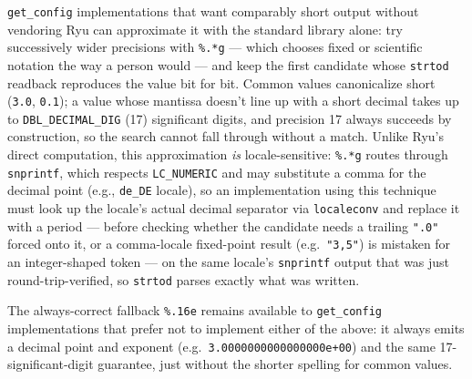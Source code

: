 \documentclass[../RFC-HDFG-2026-001.tex]{subfiles}
\begin{document}
\texttt{get\_config} implementations that want comparably short output
without vendoring Ryu can approximate it with the standard library alone:
try successively wider precisions with \texttt{\%.*g} --- which chooses
fixed or scientific notation the way a person would --- and keep the first
candidate whose \texttt{strtod} readback reproduces the value bit for bit.
Common values canonicalize short (\texttt{3.0}, \texttt{0.1}); a value whose
mantissa doesn't line up with a short decimal takes up to
\texttt{DBL\_DECIMAL\_DIG} (17) significant digits, and precision 17 always
succeeds by construction, so the search cannot fall through without a
match.  Unlike Ryu's direct computation, this approximation \emph{is}
locale-sensitive: \texttt{\%.*g} routes through \texttt{snprintf}, which
respects \texttt{LC\_NUMERIC} and may substitute a comma for the decimal
point (e.g., \texttt{de\_DE} locale), so an implementation using this
technique must look up the locale's actual decimal separator via
\texttt{localeconv} and replace it with a period --- before checking whether
the candidate needs a trailing \texttt{".0"} forced onto it, or a
comma-locale fixed-point result (e.g.\ \texttt{"3,5"}) is mistaken for an
integer-shaped token --- on the same locale's \texttt{snprintf} output that
was just round-trip-verified, so \texttt{strtod} parses exactly what was
written.

The always-correct fallback \texttt{\%.16e} remains available to
\texttt{get\_config} implementations that prefer not to implement either of
the above: it always emits a decimal point and exponent
(e.g.\ \texttt{3.0000000000000000e+00}) and the same 17-significant-digit
guarantee, just without the shorter spelling for common values.
\end{document}
